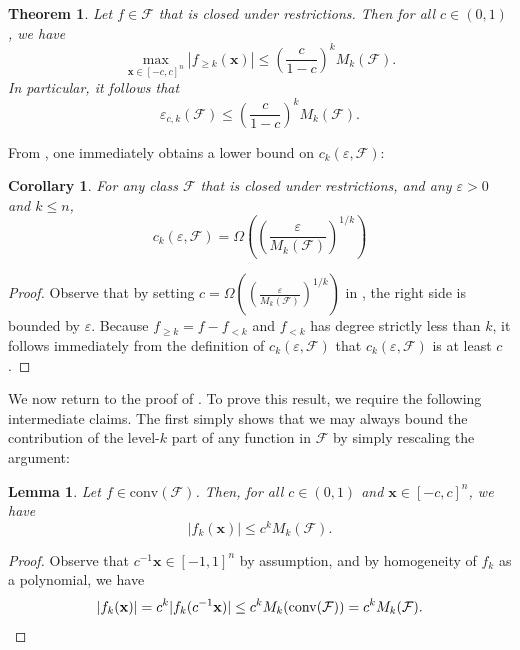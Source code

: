 \documentclass[10pt,a4paper]{article}
\newcommand{\eps}{\varepsilon}
\newtheorem{lemma}[theorem]{Lemma}
\newtheorem{corollary}[theorem]{Corollary}
\newtheorem{THM}[theorem]{Theorem}
\theoremstyle{definition}
\begin{document}
\begin{THM}
\label{thm:main}
        Let $f\in \mathcal{F}$ that is closed under restrictions. Then for all $c \in (0,1)$, we have     \begin{equation*}
        \max_{\mathbf{x} \in [-c , c]^n } \left \vert f_{\geq k} (\mathbf{x}) \right\vert \leq \left( \frac{c}{1 - c} \right)^k M_k(\mathcal{F}).
    \end{equation*}
    In particular, it follows that
    \begin{equation*}
        \eps_{c,k}(\mathcal{F})\leq \left( \frac{c}{1 - c} \right)^k M_k(\mathcal{F}).
    \end{equation*}
\end{THM}
From , one immediately obtains a lower bound on $c_k(\eps,\mathcal{F})$:
\begin{corollary}
\label{cor:ckbound}
For any class $\mathcal{F}$ that is closed under restrictions, and any $\eps>0$ and $k\leq n$, 
\begin{equation*}
    c_k(\eps,\mathcal{F}) = \Omega\left(\left(\frac{\eps}{M_k(\mathcal{F})}\right)^{1/k}\right)
\end{equation*}
\end{corollary}
\begin{proof}
Observe that by setting $c=\Omega\left(\left(\frac{\eps}{M_k(\mathcal{F})}\right)^{1/k}\right)$ in , the right side is bounded by $\eps$. Because $f_{\geq k}=f-f_{<k}$ and $f_{<k}$ has degree strictly less than $k$, it follows immediately from the definition of $c_k(\eps,\mathcal{F})$ that $c_k(\eps,\mathcal{F})$ is at least $c$.
\end{proof}
    We now return to the proof of . To prove this result, we require the following intermediate claims. The first simply shows that we may always bound the contribution of the level-$k$ part of any function in $\mathcal{F}$ by simply rescaling the argument: 
    \begin{lemma} 
    \label{lem:mult}
        Let $f \in \mathrm{conv}(\mathcal{F})$. 
        Then, for all $c\in ( 0,1 )$ and $\mathbf{x} \in [-c , c  ]^n$, we have 
        \begin{equation*}
            \vert f_k(\mathbf{x})\vert \leq c^k M_k(\mathcal{F}). 
        \end{equation*}
    \end{lemma}
    
    \begin{proof}
    Observe that $c^{-1}\mathbf{x}\in [-1,1]^n$ by assumption, and by homogeneity of $f_{k}$ as a polynomial, we have
    \begin{equation*}
        \vert f_k(\mathbf{x})\vert=c^k \vert f_k(c^{-1}\mathbf{x})\vert\leq c^k M_k(\mathrm{conv}(\mathcal{F}))= c^k M_k(\mathcal{F}). \qedhere
    \end{equation*}
    \end{proof}
\end{document}
